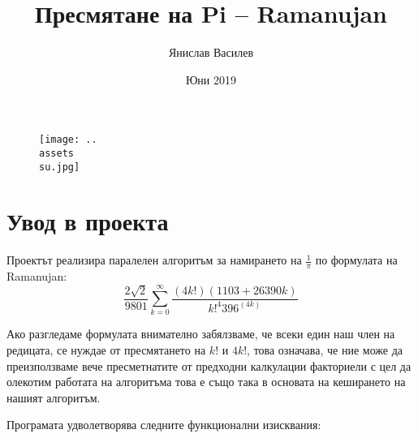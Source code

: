 \documentclass[a4paper,english]{article}
\title{Пресмятане на Pi – Ramanujan}
\author{Янислав Василев}
\date{Юни 2019}
\begin{document}
\begin{figure}
\centering
\texttt{[image: ..\\assets\\su.jpg]}
\end{figure}

\maketitle
\newpage
\section{Увод в проекта}
Проектът реализира паралелен алгоритъм за намирането на \begin{math}\frac{1}{\pi}\end{math} по формулата на Ramanujan:
\[
    \frac{2\sqrt{2}}{9801}\sum_{k=0}^{\infty} \frac{(4k!)(1103 + 26390k)}{k!^4 396^(4k)}
\]

Ако разгледаме формулата внимателно забялзваме, че всеки един наш член на редицата, се нуждае от пресмятането на \begin{math}k!\end{math} и \begin{math}4k!\end{math}, това означава, че ние може да преизползваме вече пресметнатите от предходни калкулации факториели с цел да олекотим работата на алгоритъма това е също така в основата на кеширането на нашият алгоритъм.\hfill

\vspace{3mm}

Програмата удволетворява следните функционални изисквания:
\end{document}
